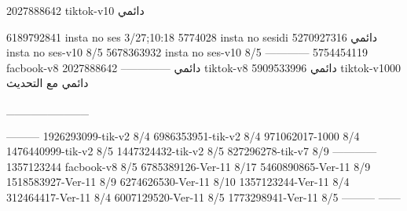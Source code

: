 2027888642 tiktok-v10
دائمي

6189792841 insta no ses
3/27;10:18
5774028 insta no sesidi
دائمي
5270927316 insta no ses-v10
8/5
5678363932 insta no ses-v10
8/5
------------
5754454119 facbook-v8
دائمي
--------------
2027888642 tiktok-v8
دائمي
5909533996 tiktok-v1000
دائمي مع التحديث

__________

---------
1926293099-tik-v2
8/4
6986353951-tik-v2
8/4
971062017-1000
8/4
1476440999-tik-v2
8/5
1447324432-tik-v2
8/5
827296278-tik-v7
8/9
------------
1357123244 facbook-v8
8/5
6785389126-Ver-11
8/17
5460890865-Ver-11
8/9
1518583927-Ver-11
8/9
6274626530-Ver-11
8/10
1357123244-Ver-11
8/4
312464417-Ver-11
8/4
6007129520-Ver-11
8/5
1773298941-Ver-11
8/5
---------
------
